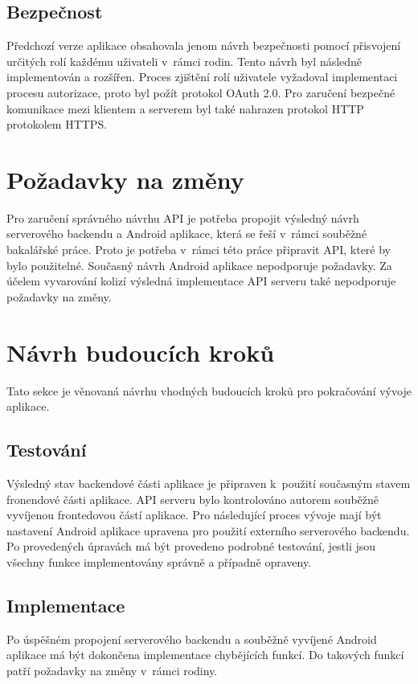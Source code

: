     \subsection{Bezpečnost}
        Předchozí verze aplikace obsahovala jenom návrh bezpečnosti pomocí přisvojení určitých rolí každému uživateli v~rámci rodin. Tento návrh byl následně implementován a rozšířen. Proces zjištění rolí uživatele vyžadoval implementaci procesu autorizace, proto byl požít protokol OAuth 2.0. Pro zaručení bezpečné komunikace mezi klientem a serverem byl také nahrazen protokol HTTP protokolem HTTPS.
        
    \section{Požadavky na změny}
        Pro zaručení správného návrhu API je potřeba propojit výsledný návrh serverového backendu a Android aplikace, která se řeší v~rámci souběžné bakalářské práce. Proto je potřeba v~rámci této  práce připravit API, které by bylo použitelné. Současný návrh Android aplikace nepodporuje požadavky. Za účelem vyvarování kolizí výsledná implementace API serveru také nepodporuje požadavky na změny.

\section{Návrh budoucích kroků}
    Tato sekce je věnovaná návrhu vhodných budoucích kroků pro pokračování vývoje aplikace.
    
    \subsection{Testování}
        Výsledný stav backendové části aplikace je připraven k~použití současným stavem fronendové části aplikace. API serveru bylo kontrolováno autorem souběžně vyvíjenou frontedovou částí aplikace. Pro následující proces vývoje mají být nastavení Android aplikace upravena pro použití externího serverového backendu. Po provedených úpravách má být provedeno podrobné testování, jestli jsou všechny funkce implementovány správně a případně opraveny.
    
    \subsection{Implementace}
        Po úspěšném propojení serverového backendu a souběžně vyvíjené Android aplikace má být dokončena implementace chybějících funkcí. Do takových funkcí patří požadavky na změny v~rámci rodiny. 
        
